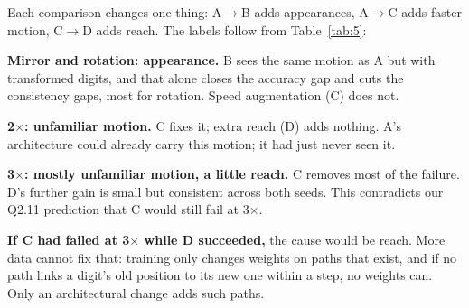 \documentclass[11pt, a4paper]{article}
\begin{document}
Each comparison changes one thing: A$\to$B adds appearances, A$\to$C adds faster motion, C$\to$D adds reach. The labels follow from Table~\ref{tab:5}:

\begin{center}
\end{center}

\textbf{Mirror and rotation: appearance.} B sees the same motion as A but with transformed digits, and that alone closes the accuracy gap and cuts the consistency gaps, most for rotation. Speed augmentation (C) does not.

\textbf{2$\times$: unfamiliar motion.} C fixes it; extra reach (D) adds nothing. A's architecture could already carry this motion; it had just never seen it.

\textbf{3$\times$: mostly unfamiliar motion, a little reach.} C removes most of the failure. D's further gain is small but consistent across both seeds. This contradicts our Q2.11 prediction that C would still fail at 3$\times$.

\textbf{If C had failed at 3$\times$ while D succeeded,} the cause would be reach. More data cannot fix that: training only changes weights on paths that exist, and if no path links a digit's old position to its new one within a step, no weights can. Only an architectural change adds such paths.
\end{document}
